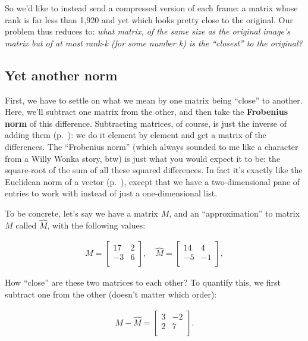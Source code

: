 \begin{alttitles}
So we'd like to instead send a compressed version of each frame: a matrix whose
rank is far less than 1,920 and yet which looks pretty close to the original.
Our problem thus reduces to: \textit{what matrix, of the same size as the
original image's matrix but of at most rank-k (for some number k) is the
``closest'' to the original?}

\subsection{Yet another norm}


First, we have to settle on what we mean by one matrix being ``close'' to
another. Here, we'll subtract one matrix from the other, and then take the
\textbf{Frobenius norm} of this difference. Subtracting matrices, of course, is
just the inverse of adding them (p.~\pageref{matrixAddition}): we do it element
by element and get a matrix of the differences. The ``Frobenius norm'' (which
always sounded to me like a character from a Willy Wonka story, btw) is just
what you would expect it to be: the square-root of the sum of all these squared
differences. In fact it's exactly like the Euclidean norm of a vector
(p.~\pageref{Euclideannorm}), except that we have a two-dimensional pane of
entries to work with instead of just a one-dimensional list.

To be concrete, let's say we have a matrix $M$, and an ``approximation'' to
matrix $M$ called $\hat{M}$, with the following values:

\vspace{-.15in}
\begin{align*}
M =
\begin{bmatrix}
17 & 2 \\
-3 & 6 \\
\end{bmatrix}, \quad
\hat{M} =
\begin{bmatrix}
14 & 4 \\
-5 & -1 \\
\end{bmatrix}, 
\end{align*}
\vspace{-.15in}

How ``close'' are these two matrices to each other? To quantify this, we first
subtract one from the other (doesn't matter which order):

\vspace{-.15in}
\begin{align*}
M - \hat{M} =
\begin{bmatrix}
3 & -2 \\
2 & 7 \\
\end{bmatrix}.
\end{align*}
\vspace{-.15in}


\end{alttitles}
